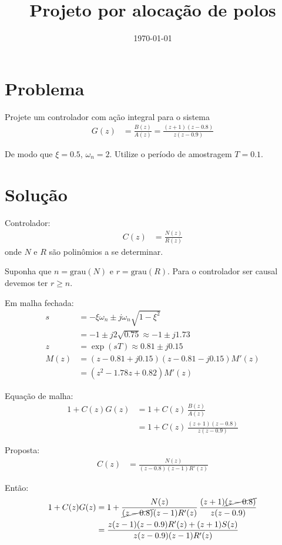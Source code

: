 \documentclass[12pt, a4paper]{article}
\title{Projeto por alocação de polos}
\date{\today}
\begin{document}
\maketitle

\section{Problema}

Projete um controlador com ação integral para o sistema 
\begin{align}
	G(z) &= \frac{B(z)}{A(z)} = \frac{(z+1)(z-0.8)}{z(z-0.9)}
\end{align}

De modo que $\xi=0.5$, $\omega_n=2$. Utilize o período de amostragem $T=0.1$.

\section{Solução}

Controlador:
\begin{align}
	C(z) &= \frac{N(z)}{R(z)}
\end{align}
onde $N$ e $R$ são polinômios a se determinar. 

\newcommand{\gr}{\text{grau}}
Suponha que $n=\gr(N)$ e $r = \gr(R)$. Para o controlador ser causal devemos ter $r\geq n$. 

Em malha fechada:
\begin{align}
	s &= -\xi \omega_n \pm j \omega_n\sqrt{1-\xi^2}\\
	&= -1\pm j 2\sqrt{0.75}\approx -1\pm j1.73\\
	z &= \exp(sT) \approx 0.81 \pm j0.15\\
	M(z) &= (z-0.81+j0.15)(z-0.81-j0.15)M'(z) \\
	&=(z^2-1.78z+0.82)M'(z)
\end{align}

Equação de malha:
\begin{align}
	1+C(z)G(z) &= 1+C(z)\,\frac{B(z)}{A(z)}\\
	&= 1+ C(z)\,\frac{(z+1)(z-0.8)}{z(z-0.9)}
\end{align}

Proposta:
\begin{align}
	C(z) &= \frac{N(z)}{(z-0.8)(z-1)R'(z)}
\end{align}

Então:
\begin{align}
	1+C(z)G(z)
	&=1+\frac{N(z)}{\cancel{(z-0.8)}(z-1)R'(z)}\,\frac{(z+1)\cancel{(z-0.8)}}{z(z-0.9)}\\ 
	&= \frac{z(z-1)(z-0.9)R'(z)+(z+1)S(z)}{z(z-0.9)(z-1)R'(z)}
\end{align}
\end{document}
